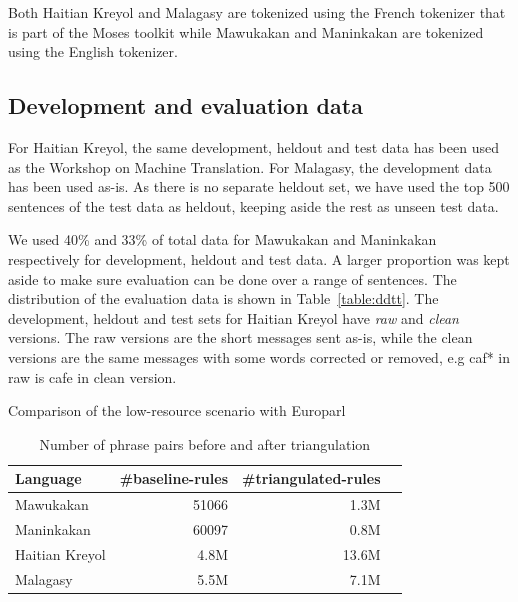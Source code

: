     Both Haitian Kreyol and Malagasy are tokenized using the French tokenizer that is part of the Moses toolkit while Mawukakan and Maninkakan are tokenized using the English tokenizer.

\subsection{Development and evaluation data}
	For Haitian Kreyol, the same development, heldout and test data has been used as the Workshop on Machine Translation. For Malagasy, the development data has been used as-is. As there is no separate heldout set, we have used the top 500 sentences of the test data as heldout, keeping aside the rest as unseen test data. 

	We used 40\% and 33\% of total data for Mawukakan and Maninkakan respectively for development, heldout and test data. A larger proportion was kept aside to make sure evaluation can be done over a range of sentences. The distribution of the evaluation data is shown in Table~\ref{table:ddtt}. The development, heldout and test sets for Haitian Kreyol have \emph{raw} and \emph{clean} versions. The raw versions are the short messages sent as-is, while the clean versions are the same messages with some words corrected or removed, e.g caf* in raw is cafe in clean version. 


\begin{table}
	\small
	\centering
	
	\caption{Comparison of the low-resource scenario with Europarl}
	\label{table:datasettings}
\end{table}

\begin{table}
	\small
	\centering
	\begin{tabular}{lrrr}
	\toprule
	Language & \#baseline-rules & \#triangulated-rules \\
	\toprule
	Mawukakan & 51066 & 1.3M \\
	Maninkakan & 60097 & 0.8M \\
	Haitian Kreyol & 4.8M & 13.6M \\
	Malagasy & 5.5M & 7.1M \\
	\bottomrule
	\end{tabular}
	\caption{Number of phrase pairs before and after triangulation}
	\label{table:mul_rules}
\end{table}

